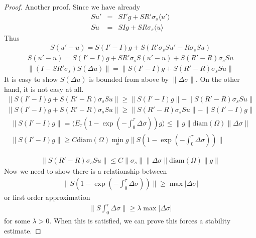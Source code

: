 \documentclass[12pt,a4paper]{article}
\newcommand{\avg}[1]{\langle#1\rangle}
\begin{document}
\begin{proof}
Another proof.
Since we have already
\begin{eqnarray}
Su'&=& SI' g + SR'\sigma_s \avg{u'}\\
Su  &=& SI g + SR\sigma_s \avg{u}
\end{eqnarray}
Thus
\begin{eqnarray}
S(u'-u) = S(I'-I)g + S(R'\sigma_sSu' - R\sigma_sSu)
\end{eqnarray}
\begin{eqnarray}
S(u'-u) = S(I'-I)g + SR'\sigma_sS(u'-u) + S(R'-R)\sigma_sSu
\end{eqnarray}
\begin{eqnarray}
\|(I - SR'\sigma_s)S(\Delta u)\| = \|S(I'-I)g + S(R'-R)\sigma_s Su\|
\end{eqnarray}
It is easy to show $S(\Delta u)$ is bounded from above by $\|\Delta\sigma\|$. On the other hand, it is not easy at all.
\begin{eqnarray}
\|S(I'-I)g + S(R'-R)\sigma_s Su\|\ge \|S(I'-I)g\| - \|S(R'-R)\sigma_s Su\|\\
\|S(I'-I)g + S(R'-R)\sigma_s Su\|\ge  \|S(R'-R)\sigma_s Su\| - \|S(I'-I)g\| 
\end{eqnarray}
\begin{eqnarray}
\|S(I'-I)g\| =\avg{E_{\tau}(1-\exp(-\int_0^{\tau}\Delta\sigma))g}\le \|g\|\mathrm{diam}(\Omega)\|\Delta\sigma\|\\
\|S(I'-I)g\|\ge C\mathrm{diam}(\Omega) \min_x g\|S(1 - \exp(-\int_0^{\tau}\Delta\sigma))\|
\end{eqnarray}

\begin{eqnarray}
\|S(R'-R)\sigma_s Su\| \le C\|\sigma_s\|\|\Delta\sigma\|\mathrm{diam}(\Omega)\|g\|
\end{eqnarray}
Now we need to show there is a relationship between
\begin{eqnarray}
\|S(1 - \exp(-\int_0^{\tau}\Delta\sigma))\|\ge \max|\Delta\sigma|
\end{eqnarray}
or first order approximation
\begin{eqnarray}
\|S\int_0^{\tau}\Delta\sigma\|\ge \lambda \max|\Delta\sigma|
\end{eqnarray}
for some $\lambda>0$.
When this is satisfied, we can prove this forces a stability estimate. 
\end{proof}
\end{document}
